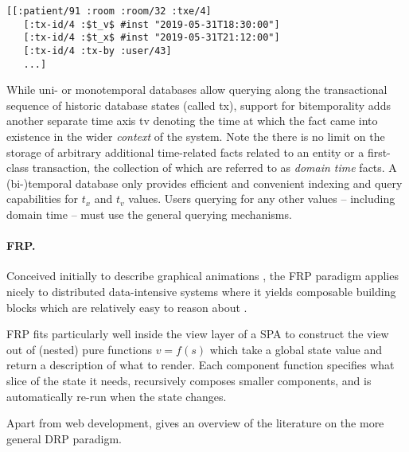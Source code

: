 \begin{lstlisting}[label={lst:examplefactstx},morekeywords={:tx-id/4},caption=Transaction metadata are first-class facts]
  [[:patient/91 :room :room/32 :txe/4]
   [:tx-id/4 :$t_v$ #inst "2019-05-31T18:30:00"]
   [:tx-id/4 :$t_x$ #inst "2019-05-31T21:12:00"]
   [:tx-id/4 :tx-by :user/43]
   ...]
  \end{lstlisting}

While uni- or monotemporal databases allow querying along the transactional sequence of historic database states (called \gls{tx}), support for bitemporality adds another separate time axis \gls{tv} denoting the time at which the fact came into existence in the wider \emph{context} of the system. Note the there is no limit on the storage of arbitrary additional time-related facts related to an entity or a first-class transaction, the collection of which are referred to as \emph{domain time} facts. A (bi-)temporal database only provides efficient and convenient indexing and query capabilities for $t_x$ and $t_v$ values. Users querying for any other values -- including domain time -- must use the general querying mechanisms.

\paragraph{\gls{FRP}.}
Conceived initially to describe graphical animations \cite{elliott1997functional}, the FRP paradigm applies nicely to distributed data-intensive systems where it yields composable building blocks which are relatively easy to reason about \cite{reynders2014multi}.

FRP fits particularly well inside the view layer of a \gls{SPA} to construct the view out of (nested) pure functions $v=f(s)$ which take a global state value and return a description of what to render. Each component function specifies what slice of the state it needs, recursively composes smaller components, and is automatically re-run when the state changes.

Apart from web development, \cite{salvaneschi2013towards} gives an overview of the literature on the more general \gls{DRP} paradigm.


\cleardoublepage
